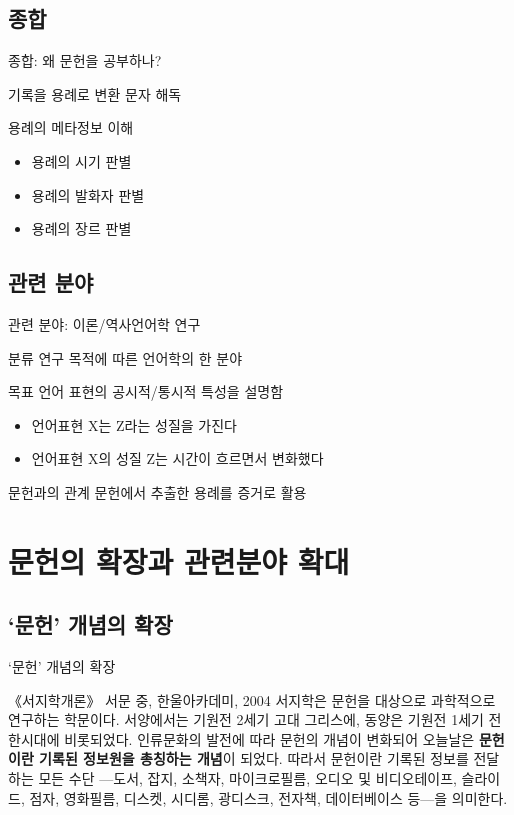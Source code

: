 \documentclass[11pt, aspectratio=169]{beamer}
\begin{document}
\subsection{종합}
\begin{frame}[t]{종합: 왜 문헌을 공부하나?}
  \begin{block}{기록을 용례로 변환}
    문자 해독    
  \end{block}

  \begin{block}{용례의 메타정보 이해}
    \begin{itemize}
          \item 용례의 시기 판별
          \item 용례의 발화자 판별
          \item 용례의 장르 판별
    \end{itemize}
  \end{block}
\end{frame}

\subsection{관련 분야}
\begin{frame}[t]{관련 분야: 이론/역사언어학 연구}
  \begin{block}{분류}
        연구 목적에 따른 언어학의 한 분야
  \end{block}
  \begin{block}{목표}
        언어 표현의 공시적/통시적 특성을 설명함
  \end{block}
    \begin{itemize}
      \item 언어표현 X는 Z라는 성질을 가진다
      \item 언어표현 X의 성질 Z는 시간이 흐르면서 변화했다
    \end{itemize}        
  \begin{block}{문헌과의 관계}
        문헌에서 추출한 용례를 증거로 활용
  \end{block}
\end{frame}

\section{문헌의 확장과 관련분야 확대}

\subsection{‘문헌’ 개념의 확장}
\begin{frame}[t]{‘문헌’ 개념의 확장}
  \begin{block}{{《서지학개론》 서문 중, 한울아카데미, 2004}}
    서지학은 문헌을 대상으로 과학적으로 연구하는 학문이다. 서양에서는 기원전 2세기 고대 그리스에, 동양은 기원전 1세기 전한시대에 비롯되었다. 인류문화의 발전에 따라 문헌의 개념이 변화되어 오늘날은 \textbf{문헌이란 기록된 정보원을 총칭하는 개념}이 되었다. 따라서 문헌이란 기록된  정보를 전달하는 모든 수단 —도서, 잡지, 소책자, 마이크로필름, 오디오 및 비디오테이프, 슬라이드, 점자, 영화필름, 디스켓, 시디롬, 광디스크, 전자책, 데이터베이스 등—을 의미한다.
  \end{block}
\end{frame}
\end{document}
